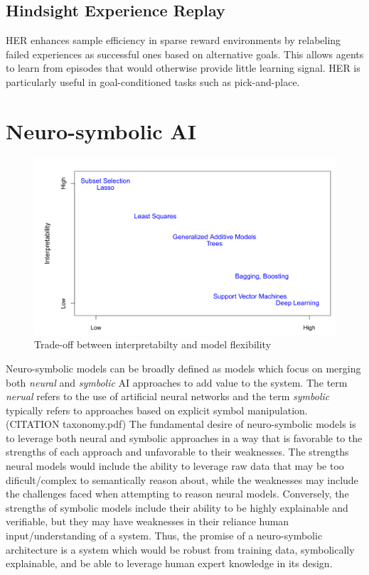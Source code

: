 \subsection{Hindsight Experience Replay} \label{ss:hindsight_experience_replay}
HER enhances sample efficiency in sparse reward environments by relabeling failed experiences as successful ones based on alternative goals. This allows agents to learn from episodes that would otherwise provide little learning signal. HER is particularly useful in goal-conditioned tasks such as pick-and-place.

\section{Neuro-symbolic AI} \label{se:neurosymbolic_ai}

\begin{figure}[htb]
	\centering
	\includegraphics[scale=0.25]{./images/interpretability_vs_flexibility.png}
	\caption{Trade-off between interpretabilty and model flexibility} 
\end{figure}

Neuro-symbolic models can be broadly defined as models which focus on merging both \textit{neural} and \textit{symbolic} AI approaches to add value to the system. The term \textit{nerual} refers to the use of artificial neural networks and the term \textit{symbolic} typically refers to approaches based on explicit symbol manipulation. (CITATION taxonomy.pdf) The fundamental desire of neuro-symbolic models is to leverage both neural and symbolic approaches in a way that is favorable to the strengths of each approach and unfavorable to their weaknesses. The strengths neural models would include the ability to leverage raw data that may be too dificult/complex to semantically reason about, while the weaknesses may include the challenges faced when attempting to reason neural models. Conversely, the strengths of symbolic models include their ability to be highly explainable and verifiable, but they may have weaknesses in their reliance human input/understanding of a system. Thus, the promise of a neuro-symbolic architecture is a system which would be robust from training data, symbolically explainable, and be able to leverage human expert knowledge in its design. 

